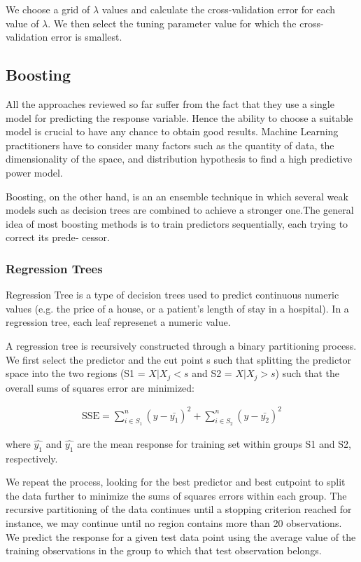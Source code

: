 We choose a grid of $\lambda$ values and calculate the cross-validation error
for each value of $\lambda$. We then select the tuning parameter value for which
the cross-validation error is smallest.

\subsection{Boosting}

All the approaches reviewed so far suffer from the fact that they use a single
model for predicting the response variable. Hence the ability to choose a
suitable model is crucial to have any chance to obtain good results.
Machine Learning practitioners have to consider many factors such as
the quantity of data, the dimensionality of the space, and distribution
hypothesis to find a high predictive power model.

Boosting, on the other hand, is an an ensemble technique in which several weak
models such as decision trees  are combined to achieve a stronger one.The
general idea of most boosting methods is to train predictors sequentially, each
trying to correct its prede‐ cessor.

\subsubsection*{Regression Trees}

Regression Tree is a type of decision trees  used to predict continuous
numeric values (e.g. the price of a house, or a patient's length of stay in a
hospital). In a regression tree, each leaf represenet a numeric value.

A regression tree is recursively constructed through a binary partitioning
process. We first select the predictor  and the cut point s such that splitting
the predictor space into the two regions (S1 = {${X|X_j <s}$} and S2 = {${X|X_j
> s}$}) such that the overall sums of squares error are minimized:

\begin{eqnarray}
  \textrm{SSE} = \sum_{i\in S_1}^{n}(y-\bar{y_1})^2 + \sum_{i \in S_2}^{n}(y-\bar{y_2})^2
\end{eqnarray}


where $\hat{y_1}$ and  $\hat{y_1}$ are the mean response for  training set within groups
S1 and S2, respectively.

We repeat the process, looking for the best predictor and best cutpoint to split
the data further to minimize the sums of squares errors within each group. The
recursive partitioning of the data continues until a stopping criterion reached
for instance, we may continue until no region contains more than 20
observations.
We predict the response for a given test data point using the average value of
the training observations in the group to which that test observation belongs.



